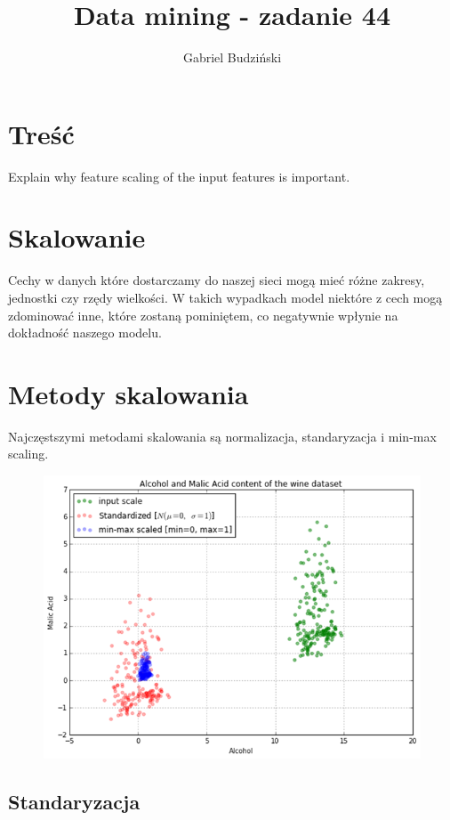 \documentclass{article}
\title{Data mining {-} zadanie 44}
\author{Gabriel Budziński}
\begin{document}
\maketitle

\section{Treść}

Explain why feature scaling of the input features is important.

\section{Skalowanie}

Cechy w danych które dostarczamy do naszej sieci mogą mieć różne zakresy, jednostki czy rzędy wielkości. W takich wypadkach model niektóre z cech mogą zdominować inne, które zostaną pominiętem, co negatywnie wpłynie na dokładność naszego modelu.

\section{Metody skalowania}

Najczęstszymi metodami skalowania są normalizacja, standaryzacja i min-max scaling.

\begin{figure}[H]
    \centering
    \includegraphics[scale=0.6]{scaling.png}
\end{figure}


\subsection{Standaryzacja}
\end{document}
